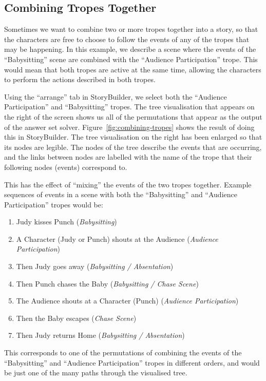 \documentclass[11pt]{report}
\begin{document}
\subsection{Combining Tropes Together}
\label{sec:combining-tropes}

Sometimes we want to combine two or more tropes together into a story, so that
the characters are free to choose to follow the events of any of the tropes that
may be happening. In this example, we describe a scene where the events of the
``Babysitting'' scene are combined with the ``Audience Participation'' trope.
This would mean that both tropes are active at the same time, allowing the
characters to perform the actions described in both tropes.

Using the ``arrange'' tab in StoryBuilder, we select both the ``Audience
Participation'' and ``Babysitting'' tropes. The tree visualisation that appears
on the right of the screen shows us all of the permutations that appear as the
output of the answer set solver. Figure~\ref{fig:combining-tropes} shows the
result of doing this in StoryBuilder. The tree visualisation on the right has
been enlarged so that its nodes are legible. The nodes of the tree describe the
events that are occurring, and the links between nodes are labelled with the
name of the trope that their following nodes (events) correspond to.

This has the effect of ``mixing'' the events of the two tropes together. Example
sequences of events in a scene with both the ``Babysitting'' and ``Audience
Participation'' tropes would be:

\begin{enumerate}
\item Judy kisses Punch (\emph{Babysitting})
\item A Character (Judy or Punch) shouts at the Audience (\emph{Audience Participation})
\item Then Judy goes away (\emph{Babysitting / Absentation})
\item Then Punch chases the Baby (\emph{Babysitting / Chase Scene})
\item The Audience shouts at a Character (Punch) (\emph{Audience Participation})
\item Then the Baby escapes (\emph{Chase Scene})
\item Then Judy returns Home (\emph{Babysitting / Absentation})
\end{enumerate}

This corresponds to one of the permutations of combining the events of the
``Babysitting'' and ``Audience Participation'' tropes in different orders, and
would be just one of the many paths through the visualised tree.
\end{document}
